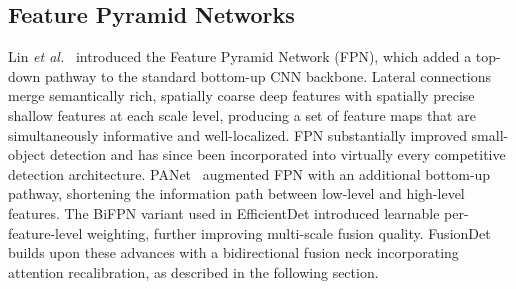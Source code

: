 \subsection{Feature Pyramid Networks}

Lin \textit{et al.}~\cite{lin2017feature} introduced the
Feature Pyramid Network (FPN), which added a top-down pathway
to the standard bottom-up CNN backbone.  Lateral connections
merge semantically rich, spatially coarse deep features with
spatially precise shallow features at each scale level, producing
a set of feature maps that are simultaneously informative and
well-localized.  FPN substantially improved small-object
detection and has since been incorporated into virtually every
competitive detection architecture.  PANet~\cite{liu2018path}
augmented FPN with an additional bottom-up pathway, shortening
the information path between low-level and high-level features.
The BiFPN variant used in EfficientDet introduced learnable
per-feature-level weighting, further improving multi-scale
fusion quality.  FusionDet builds upon these advances with a
bidirectional fusion neck incorporating attention recalibration,
as described in the following section.
